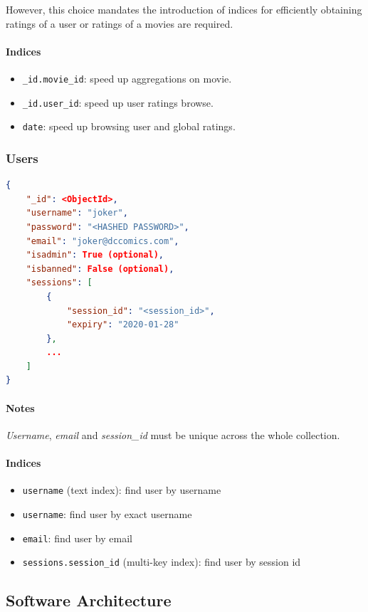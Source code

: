 \documentclass[11pt]{article}
\begin{document}
However, this choice mandates the introduction of indices for efficiently 
obtaining ratings of a user or ratings of a movies are required.

\paragraph{Indices} 
\begin{itemize}
	\item \texttt{\_id.movie\_id}: speed up aggregations on movie.
	\item \texttt{\_id.user\_id}: speed up user ratings browse.
	\item \texttt{date}: speed up browsing user and global ratings.
\end{itemize}

\subsubsection{Users}
\label{sec:users}

\begin{lstlisting}[language=json]	
{
	"_id": <ObjectId>,
	"username": "joker",
	"password": "<HASHED PASSWORD>",
	"email": "joker@dccomics.com",
	"isadmin": True (optional),
	"isbanned": False (optional),
	"sessions": [
		{
			"session_id": "<session_id>",
			"expiry": "2020-01-28"
		},
		...
	]
}
\end{lstlisting}
\paragraph{Notes}
\emph{Username}, \emph{email} and \emph{session\_id} must be unique across the whole collection.

\paragraph{Indices} 
\begin{itemize}
	\item \texttt{username} (text index): find user by username
	\item \texttt{username}: find user by exact username
	\item \texttt{email}: find user by email
	\item \texttt{sessions.session\_id} (multi-key index): find user by session id
\end{itemize}

\subsection{Software Architecture}
\end{document}

